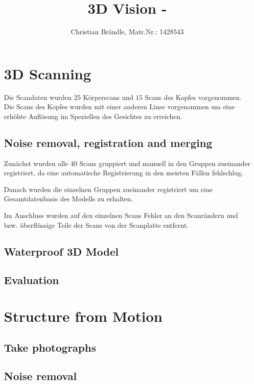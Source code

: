 \documentclass[]{article}
\title{3D Vision - }
\author{Christian Br\"andle, Matr.Nr.: 1428543}
\begin{document}
\maketitle


\section{3D Scanning}

Die Scandaten wurden $25$ Körperscans und $15$ Scans des Kopfes vorgenommen.
Die Scans des Kopfes wurden mit einer anderen Linse vorgenommen um eine erhöhte Auflösung im Speziellen des Gesichtes zu erreichen.

\subsection{Noise removal, registration and merging}

Zunächst wurden alle $40$ Scans gruppiert und manuell in den Gruppen zueinander registriert, da eine automatische Registrierung in den meisten Fällen fehlschlug.

Danach wurden die einzelnen Gruppen zueinander registriert um eine Gesamtdatenbasis des Modells zu erhalten.

Im Anschluss wurden auf den einzelnen Scans Fehler an den Scanrändern und bzw. überflüssige Teile der Scans von der Scanplatte entfernt.

\subsection{Waterproof 3D Model}

\subsection{Evaluation}


\section{Structure from Motion}

\subsection{Take photographs}

\subsection{Noise removal}
\end{document}
